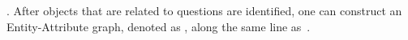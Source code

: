 . After objects that are related to questions are identified, one can construct an Entity-Attribute graph, denoted as , along the same line as~\cite{peixi2019}. 



